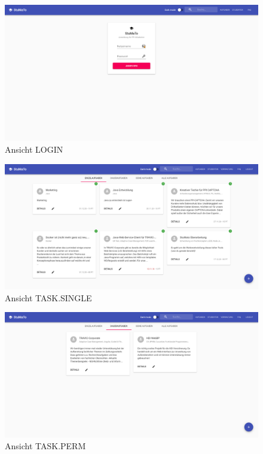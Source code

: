 \documentclass[
  12pt,
  ngerman,
  a4paper,
]{article}
\begin{document}
\begin{figure}
\centering
\includegraphics{./tex2pdf.-c803d322dfea80aa/9c5b8c473ccddcd0dab08da12cb1120c18a9138c.png}
\caption{Ansicht LOGIN}
\end{figure}

\begin{figure}
\centering
\includegraphics{./tex2pdf.-c803d322dfea80aa/f4cc5b5ab578b1b679cdbb7e8f0658dd5512d9e2.png}
\caption{Ansicht TASK.SINGLE}
\end{figure}

\begin{figure}
\centering
\includegraphics{./tex2pdf.-c803d322dfea80aa/d3c6a43d479a4c11a45a24bd6d652630f2dfa188.png}
\caption{Ansicht TASK.PERM}
\end{figure}
\end{document}
